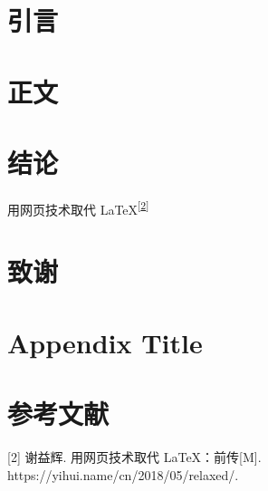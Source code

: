 \documentclass{hnuthesis}
\begin{document}
\frontmatter
\makecover

\begin{abstract}{c}{\LaTeX{}，排版，论文}
\zhlipsum[1]
\end{abstract}

\begin{abstract}{e}{\LaTeX{}, Typesetting, Thesis}
\lipsum[1]
\end{abstract}
 
\tableofcontents

\mainmatter

\chapter{引言}
\zhlipsum[1-2]

\chapter{正文}
\zhlipsum[1-15]

\chapter{结论}
用网页技术取代 \LaTeX{}\textsuperscript{{[}\hyperlink{ref-weborlatex}{2}{]}}

\backmatter

\chapter*{致谢}
\zhlipsum[1]

\appendix
\chapter{Appendix Title}
\zhlipsum[1]

\chapter*{参考文献}
\leavevmode\hypertarget{ref-weborlatex}{}%
{[}2{]} 谢益辉. 用网页技术取代 LaTeX：前传{[}M{]}.
https://yihui.name/cn/2018/05/relaxed/.
\end{document}
